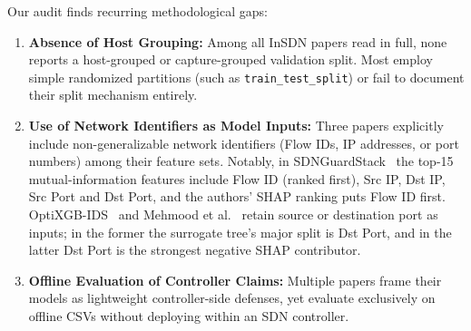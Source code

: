 \documentclass[journal]{IEEEtran}
\begin{document}
Our audit finds recurring methodological gaps:
\begin{enumerate}
    \item \textbf{Absence of Host Grouping:} Among all InSDN papers read in full, none reports a host-grouped or capture-grouped validation split. Most employ simple randomized partitions (such as \texttt{train\_test\_split}) or fail to document their split mechanism entirely.
    \item \textbf{Use of Network Identifiers as Model Inputs:} Three papers explicitly include non-generalizable network identifiers (Flow IDs, IP addresses, or port numbers) among their feature sets. Notably, in SDNGuardStack~\cite{ashikuzzaman2026sdnguardstack} the top-15 mutual-information features include Flow ID (ranked first), Src IP, Dst IP, Src Port and Dst Port, and the authors' SHAP ranking puts Flow ID first. OptiXGB-IDS~\cite{optixgb2026} and Mehmood et al.~\cite{sajid2025ddos} retain source or destination port as inputs; in the former the surrogate tree's major split is Dst Port, and in the latter Dst Port is the strongest negative SHAP contributor.
    \item \textbf{Offline Evaluation of Controller Claims:} Multiple papers frame their models as lightweight controller-side defenses, yet evaluate exclusively on offline CSVs without deploying within an SDN controller.
\end{enumerate}
\end{document}
